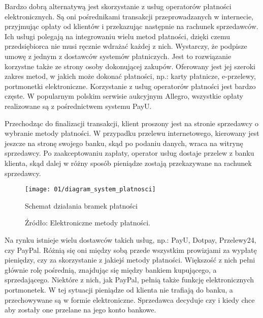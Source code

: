 Bardzo dobrą alternatywą jest skorzystanie z usług operatorów płatności elektronicznych. Są oni pośrednikami transakcji przeprowadzanych w internecie, przyjmując opłaty od klientów i przekazując następnie na rachunek sprzedawców. Ich usługi polegają na integrowaniu wielu metod płatności, dzięki czemu przedsiębiorca nie musi ręcznie wdrażać każdej z nich. Wystarczy, że podpisze umowę z jednym z dostawców systemów płatniczych. Jest to rozwiązanie korzystne także ze strony osoby dokonującej zakupów. Oferowany jest jej szeroki zakres metod, w jakich może dokonać płatności, np.: karty płatnicze, e-przelewy, portmonetki elektroniczne. Korzystanie z usług operatorów płatności jest bardzo częste. W popularnym polskim serwisie aukcyjnym Allegro, wszystkie opłaty realizowane są z pośrednictwem systemu PayU.

Przechodząc do finalizacji transakcji, klient proszony jest na stronie sprzedawcy o wybranie metody płatności. W przypadku przelewu internetowego, kierowany jest jeszcze na stronę swojego banku, skąd po podaniu danych, wraca na witrynę sprzedawcy. Po zaakceptowaniu zapłaty, operator usług dostaje przelew z banku klienta, skąd dalej w różny sposób pieniądze zostają przekazywane na rachunek sprzedawcy.

\begin{figure}[h]
	\begin{center}
		\texttt{[image: 01/diagram\_system\_platnosci]}
	\end{center}
	\caption{Schemat działania bramek płatności}
	\vspace{-0.4cm}
	\caption*{Źródło: Elektroniczne metody płatności. \cite{elektroniczne_metody_platnosci}}
\end{figure}

Na rynku istnieje wielu dostawców takich usług, np.: PayU, Dotpay, Przelewy24, czy PayPal. Różnią się oni między sobą przede wszystkim prowizjami za wypłatę pieniędzy, czy za skorzystanie z jakiejś metody płatności. Większość z nich pełni głównie rolę pośrednią, znajdując się między bankiem kupującego, a sprzedającego. Niektóre z nich, jak PayPal, pełnią także funkcję elektronicznych portmonetek. W tej sytuacji pieniądze od klienta nie trafiają do banku, a przechowywane są w formie elektroniczne. Sprzedawca decyduje czy i kiedy chce aby zostały one przelane na jego konto bankowe. 
